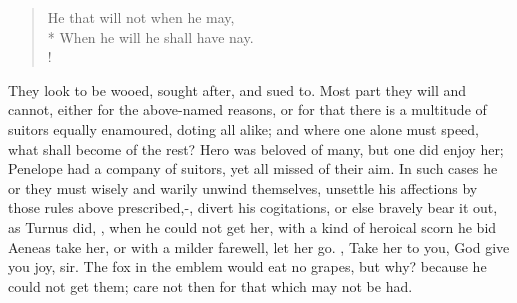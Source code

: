 \begin{verse}%
He that will not when he may,\\*
When he will he shall have nay.\\!
\end{verse}%

They look to be wooed, sought after, and sued to. Most part they will
and cannot, either for the above-named reasons, or for that there is a
multitude of suitors equally enamoured, doting all alike; and where one
alone must speed, what shall become of the rest? Hero was beloved of
many, but one did enjoy her; Penelope had a company of suitors, yet all
missed of their aim. In such cases he or they must wisely and warily
unwind themselves, unsettle his affections by those rules above
prescribed,-, divert his cogitations,
or else bravely bear it out, as Turnus did, ,
when he could not get her, with a kind of heroical scorn he bid Aeneas
take her, or with a milder farewell, let her go. , Take her to you, God give you joy, sir. The fox in the emblem
would eat no grapes, but why? because he could not get them; care not
then for that which may not be had.


